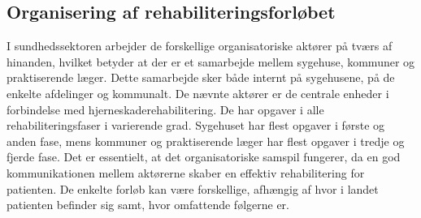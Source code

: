 \subsection{Organisering af rehabiliteringsforløbet}
I sundhedssektoren arbejder de forskellige organisatoriske aktører på tværs af hinanden, hvilket betyder at der er et samarbejde mellem sygehuse, kommuner og praktiserende læger. Dette samarbejde sker både internt på sygehusene, på de enkelte afdelinger og kommunalt. \cite{Sundhedsstyrelsen2010}
De nævnte aktører er de centrale enheder i forbindelse med hjerneskaderehabilitering. De har opgaver i alle rehabiliteringsfaser i varierende grad. Sygehuset har flest opgaver i første og anden fase, mens kommuner og praktiserende læger har flest opgaver i tredje og fjerde fase. \cite{Sundhedsstyrelsen2011a}
Det er essentielt, at det organisatoriske samspil fungerer, da en god kommunikationen mellem aktørerne skaber en effektiv rehabilitering for patienten. De enkelte forløb kan være forskellige, afhængig af hvor i landet patienten befinder sig samt, hvor omfattende følgerne er. \cite{Sundhedsstyrelsen2010}





